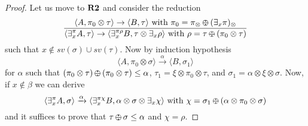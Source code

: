 \documentclass{llncs}
\def\odiv{\, {\ominus\hspace{-7.7pt} \div} \,}
\begin{document}
\begin{proof}
Let us  move to ${\bf R2}$ and consider 
%
the reduction
    $$\frac {\displaystyle \langle A, \pi_0 \otimes \tau \rangle
    \to \langle B, \tau \rangle \text{ with } \pi_0 = \pi_\otimes \odiv (\exists_x \pi)_\otimes}
    {\displaystyle\langle \exists^{\pi}_x A,\tau\rangle \to \langle 
    \exists^{\pi \rho}_x B, \tau \otimes \exists_x \rho
    \rangle \text{ with } \rho = \tau \odiv (\pi_0 \otimes \tau)} $$
%
such that $x \not \in sv(\sigma) \cup sv(\tau)$.
Now by induction hypothesis
$$\langle A, \pi_0 \otimes \sigma \rangle  \xrightarrow{\alpha}
  \langle B, \sigma_1 \rangle $$  for $\alpha$ such that 
  $(\pi_0 \otimes \tau) \odiv (\pi_ 0 \otimes \tau) \leq \alpha$,
$\tau_1 = \xi \otimes \pi_0 \otimes \tau$, and 
$\sigma_1 = \alpha \otimes \xi \otimes \sigma$.
Now, if $x \not \in \beta$ we can derive
  $${\displaystyle\langle \exists^{\pi}_x A,\sigma\rangle \xrightarrow{\alpha} 
   \langle \exists^{\pi \chi}_x B, \alpha \otimes  \sigma \otimes \exists_x \chi
    \rangle \text{ with } \chi = \sigma_1 \odiv (\alpha \otimes \pi_0 \otimes \sigma)}$$
and it suffices to prove that $\tau \odiv \sigma \leq \alpha$ and $\chi = \rho$.
%
  



\end{proof}
\end{document}
